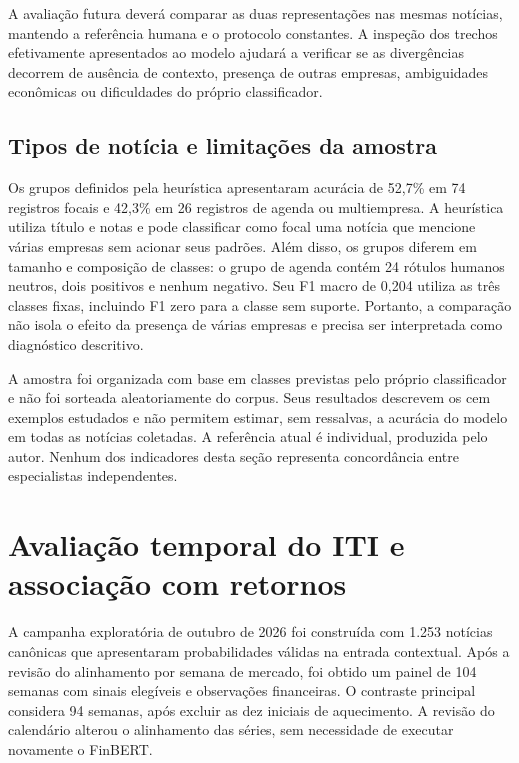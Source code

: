 A avaliação futura deverá comparar as duas representações nas mesmas notícias, mantendo a referência humana e o protocolo constantes. A inspeção dos trechos efetivamente apresentados ao modelo ajudará a verificar se as divergências decorrem de ausência de contexto, presença de outras empresas, ambiguidades econômicas ou dificuldades do próprio classificador.

\subsection{Tipos de notícia e limitações da amostra}

Os grupos definidos pela heurística apresentaram acurácia de 52,7\% em 74 registros focais e 42,3\% em 26 registros de agenda ou multiempresa. A heurística utiliza título e notas e pode classificar como focal uma notícia que mencione várias empresas sem acionar seus padrões. Além disso, os grupos diferem em tamanho e composição de classes: o grupo de agenda contém 24 rótulos humanos neutros, dois positivos e nenhum negativo. Seu F1 macro de 0,204 utiliza as três classes fixas, incluindo F1 zero para a classe sem suporte. Portanto, a comparação não isola o efeito da presença de várias empresas e precisa ser interpretada como diagnóstico descritivo.

A amostra foi organizada com base em classes previstas pelo próprio classificador e não foi sorteada aleatoriamente do corpus. Seus resultados descrevem os cem exemplos estudados e não permitem estimar, sem ressalvas, a acurácia do modelo em todas as notícias coletadas. A referência atual é individual, produzida pelo autor. Nenhum dos indicadores desta seção representa concordância entre especialistas independentes.

\section{Avaliação temporal do ITI e associação com retornos}

A campanha exploratória de outubro de 2026 foi construída com 1.253 notícias canônicas que apresentaram probabilidades válidas na entrada contextual. Após a revisão do alinhamento por semana de mercado, foi obtido um painel de 104 semanas com sinais elegíveis e observações financeiras. O contraste principal considera 94 semanas, após excluir as dez iniciais de aquecimento. A revisão do calendário alterou o alinhamento das séries, sem necessidade de executar novamente o FinBERT.

